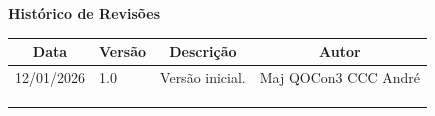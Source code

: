 \begin{table}[h]
	\begin{center}
	    \textbf{\Huge{Histórico de Revisões}}
	\end{center}
    \centering
	\begin{tabular}{|p{3cm}|p{1.5cm}|p{7.5cm}|p{3.2cm}|}
		\hline \multicolumn{1}{|c|}{\textbf{Data}} & \multicolumn{1}{|c|}{\textbf{Versão}} &
			\multicolumn{1}{|c|}{\textbf{Descrição}} & \multicolumn{1}{|c|}{\textbf{Autor}} \\ \hline
		12/01/2026 & 1.0 & Versão inicial. & Maj QOCon3 CCC André \\ \hline
		& & & \\ \hline
		& & & \\ \hline
		& & & \\ \hline
	\end{tabular}
\end{table}